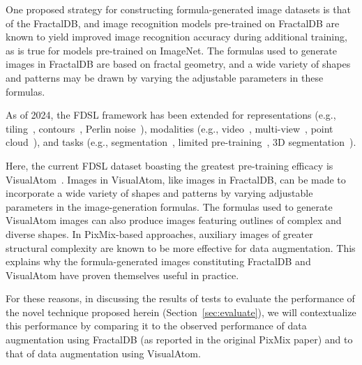 One proposed strategy for constructing
formula-generated image datasets is that
of the FractalDB, and image recognition
models pre-trained on FractalDB are known to yield improved
image recognition accuracy during additional training,
as is true for models pre-trained on ImageNet.
The formulas used to generate images in FractalDB
are based on fractal geometry, and
a wide variety of shapes and patterns may be drawn
by varying the adjustable parameters in these formulas.

As of 2024, the FDSL framework has been extended for representations (e.g., tiling~\cite{TileDB}, contours~\cite{RCDB}, Perlin noise~\cite{PerlinNoiseDB}), modalities (e.g., video~\cite{VideoPerlin}, multi-view~\cite{MV-FractalDB}, point cloud~\cite{PC-FractalDB}), and tasks (e.g., segmentation~\cite{SegRCDB}, limited pre-training~\cite{OFDB,1p-frac}, 3D segmentation~\cite{PrimGeoSeg}). 

Here, the current FDSL dataset boasting the
greatest pre-training efficacy is VisualAtom~\cite{VisualAtom}.
Images in VisualAtom, like images in FractalDB,
can be made to incorporate a wide variety
of shapes and patterns by varying adjustable parameters
in the image-generation formulas.
The formulas used to generate VisualAtom images
can also produce images featuring outlines of
complex and diverse shapes.
In PixMix-based approaches,
auxiliary images of greater structural complexity
are known to be more effective for data augmentation.
This explains why the formula-generated images
constituting FractalDB and VisualAtom have proven themselves useful in practice.

For these reasons, in discussing the results of tests to
evaluate the performance of the novel technique proposed
herein (Section~\ref{sec:evaluate}),  we will
contextualize this performance by comparing it
to the observed performance of data augmentation
using FractalDB (as reported in the original PixMix paper)
and to that of data augmentation using VisualAtom.
